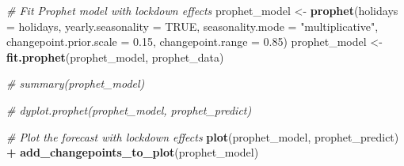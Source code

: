 \documentclass[
]{article}
\newenvironment{Shaded}{\begin{snugshade}}{\end{snugshade}}
\newcommand{\AttributeTok}[1]{\textcolor[rgb]{0.13,0.29,0.53}{#1}}
\newcommand{\CommentTok}[1]{\textcolor[rgb]{0.56,0.35,0.01}{\textit{#1}}}
\newcommand{\ConstantTok}[1]{\textcolor[rgb]{0.56,0.35,0.01}{#1}}
\newcommand{\FloatTok}[1]{\textcolor[rgb]{0.00,0.00,0.81}{#1}}
\newcommand{\FunctionTok}[1]{\textcolor[rgb]{0.13,0.29,0.53}{\textbf{#1}}}
\newcommand{\NormalTok}[1]{#1}
\newcommand{\OtherTok}[1]{\textcolor[rgb]{0.56,0.35,0.01}{#1}}
\newcommand{\SpecialCharTok}[1]{\textcolor[rgb]{0.81,0.36,0.00}{\textbf{#1}}}
\newcommand{\StringTok}[1]{\textcolor[rgb]{0.31,0.60,0.02}{#1}}
\begin{document}
\begin{Shaded}
\begin{Highlighting}[]
\CommentTok{\# Fit Prophet model with lockdown effects}
\NormalTok{prophet\_model }\OtherTok{\textless{}{-}} \FunctionTok{prophet}\NormalTok{(}\AttributeTok{holidays =}\NormalTok{ holidays, }\AttributeTok{yearly.seasonality =} \ConstantTok{TRUE}\NormalTok{,}
    \AttributeTok{seasonality.mode =} \StringTok{"multiplicative"}\NormalTok{, }\AttributeTok{changepoint.prior.scale =} \FloatTok{0.15}\NormalTok{,}
    \AttributeTok{changepoint.range =} \FloatTok{0.85}\NormalTok{)}
\NormalTok{prophet\_model }\OtherTok{\textless{}{-}} \FunctionTok{fit.prophet}\NormalTok{(prophet\_model, prophet\_data)}

\CommentTok{\# summary(prophet\_model)}
\end{Highlighting}
\end{Shaded}

\begin{Shaded}
\end{Shaded}

\begin{Shaded}
\begin{Highlighting}[]
\CommentTok{\# dyplot.prophet(prophet\_model, prophet\_predict)}
\end{Highlighting}
\end{Shaded}

\begin{Shaded}
\begin{Highlighting}[]
\CommentTok{\# Plot the forecast with lockdown effects}
\FunctionTok{plot}\NormalTok{(prophet\_model, prophet\_predict) }\SpecialCharTok{+} \FunctionTok{add\_changepoints\_to\_plot}\NormalTok{(prophet\_model)}
\end{Highlighting}
\end{Shaded}
\end{document}
